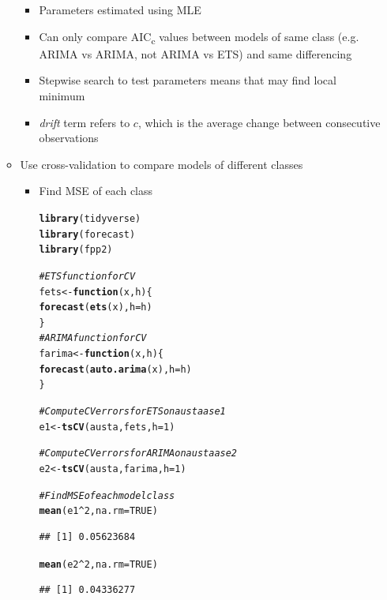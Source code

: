 \documentclass{article}\usepackage[]{graphicx}\usepackage[]{color}
\makeatletter
\newcommand{\hlnum}[1]{\textcolor[rgb]{0.686,0.059,0.569}{#1}}%
\newcommand{\hlcom}[1]{\textcolor[rgb]{0.678,0.584,0.686}{\textit{#1}}}%
\newcommand{\hlopt}[1]{\textcolor[rgb]{0,0,0}{#1}}%
\newcommand{\hlstd}[1]{\textcolor[rgb]{0.345,0.345,0.345}{#1}}%
\newcommand{\hlkwa}[1]{\textcolor[rgb]{0.161,0.373,0.58}{\textbf{#1}}}%
\newcommand{\hlkwb}[1]{\textcolor[rgb]{0.69,0.353,0.396}{#1}}%
\newcommand{\hlkwc}[1]{\textcolor[rgb]{0.333,0.667,0.333}{#1}}%
\newcommand{\hlkwd}[1]{\textcolor[rgb]{0.737,0.353,0.396}{\textbf{#1}}}%
\newenvironment{kframe}{%
 \def\at@end@of@kframe{}%
 \ifinner\ifhmode%
  \def\at@end@of@kframe{\end{minipage}}%
  \begin{minipage}{\columnwidth}%
 \fi\fi%
 \def\FrameCommand##1{\hskip\@totalleftmargin \hskip-\fboxsep
 \colorbox{shadecolor}{##1}\hskip-\fboxsep
     \hskip-\linewidth \hskip-\@totalleftmargin \hskip\columnwidth}%
 \MakeFramed {\advance\hsize-\width
   \@totalleftmargin\z@ \linewidth\hsize
   \@setminipage}}%
 {\par\unskip\endMakeFramed%
 \at@end@of@kframe}
\newenvironment{knitrout}{}{} %
\makeatother
\begin{document}
\begin{itemize}
\begin{itemize}
        \begin{itemize}
            \item Parameters estimated using MLE
            \item Can only compare AIC\textsubscript{c} values between models of same class (e.g. ARIMA vs ARIMA, not ARIMA vs ETS) and same differencing
            \item Stepwise search to test parameters means that may find local minimum
            \item \textit{drift} term refers to $c$, which is the average change between consecutive observations 
        \end{itemize}
        \item Use cross-validation to compare models of different classes
        \begin{itemize}
            \item Find MSE of each class
            
\begin{knitrout}
\color{fgcolor}\begin{kframe}
\begin{alltt}
\hlkwd{library}\hlstd{(tidyverse)}
\hlkwd{library}\hlstd{(forecast)}
\hlkwd{library}\hlstd{(fpp2)}

\hlcom{# ETS function for CV}
\hlstd{fets} \hlkwb{<-} \hlkwa{function}\hlstd{(}\hlkwc{x}\hlstd{,} \hlkwc{h}\hlstd{) \{}
    \hlkwd{forecast}\hlstd{(}\hlkwd{ets}\hlstd{(x),} \hlkwc{h} \hlstd{= h)}
\hlstd{\}}
\hlcom{# ARIMA function for CV}
\hlstd{farima} \hlkwb{<-} \hlkwa{function}\hlstd{(}\hlkwc{x}\hlstd{,} \hlkwc{h}\hlstd{) \{}
    \hlkwd{forecast}\hlstd{(}\hlkwd{auto.arima}\hlstd{(x),} \hlkwc{h}\hlstd{=h)}
\hlstd{\}}

\hlcom{# Compute CV errors for ETS on austa as e1}
\hlstd{e1} \hlkwb{<-} \hlkwd{tsCV}\hlstd{(austa, fets,} \hlkwc{h} \hlstd{=} \hlnum{1}\hlstd{)}

\hlcom{# Compute CV errors for ARIMA on austa as e2}
\hlstd{e2} \hlkwb{<-} \hlkwd{tsCV}\hlstd{(austa, farima,} \hlkwc{h} \hlstd{=} \hlnum{1}\hlstd{)}

\hlcom{# Find MSE of each model class}
\hlkwd{mean}\hlstd{(e1}\hlopt{^}\hlnum{2}\hlstd{,} \hlkwc{na.rm} \hlstd{=} \hlnum{TRUE}\hlstd{)}
\end{alltt}
\begin{verbatim}
## [1] 0.05623684
\end{verbatim}
\begin{alltt}
\hlkwd{mean}\hlstd{(e2}\hlopt{^}\hlnum{2}\hlstd{,} \hlkwc{na.rm} \hlstd{=} \hlnum{TRUE}\hlstd{)}
\end{alltt}
\begin{verbatim}
## [1] 0.04336277
\end{verbatim}
\end{kframe}
\end{knitrout}


\end{itemize}
\end{itemize}
\end{itemize}
\end{document}
